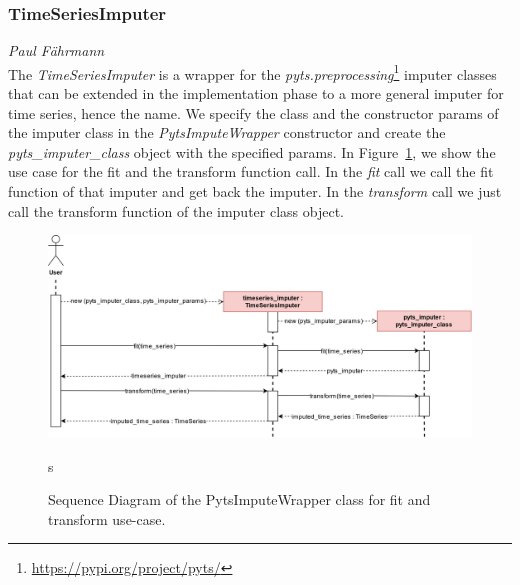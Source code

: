 \subsubsection*{TimeSeriesImputer}
\vspace*{-10mm}\hfill{\normalsize\emph{Paul Fährmann}}
\\
The \textit{TimeSeriesImputer} is a wrapper for the \textit{pyts.preprocessing}\footnote{\href{https://pypi.org/project/pyts/}{https://pypi.org/project/pyts/}} imputer classes that can be extended in the implementation phase to a more general imputer for time series, hence the name. We specify the class and the constructor params of the imputer class in the \textit{PytsImputeWrapper} constructor and create the \textit{pyts\_imputer\_class} object with the specified params. In Figure~\ref{fig:tfe-pyts-impute-seq}, we show the use case for the fit and the transform function call. In the \textit{fit} call we call the fit function of that imputer and get back the imputer. In the \textit{transform} call we just call the transform function of the imputer class object.
\begin{figure}[ht]
    \centering
    \includegraphics[width=\textwidth]{gfx/pyts_imputer_sequence}
    \caption{Sequence Diagram of the PytsImputeWrapper class for fit and transform use-case.}
    \label{fig:tfe-pyts-impute-seq}s
\end{figure}
